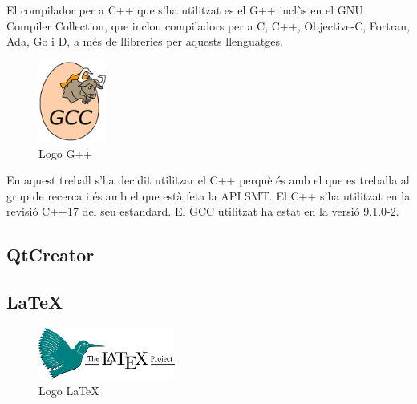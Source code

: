\documentclass[11pt,a4paper,twoside]{report}
\begin{document}
  El compilador per a C++ que s'ha utilitzat es el G++ inclòs en el GNU Compiler Collection, que inclou compiladors per a C, C++, Objective-C, Fortran, Ada, Go i D, a més de llibreries per aquests llenguatges. 
  

  \begin{figure}[ht!]
    \centering
    \includegraphics[width=0.2\textwidth]{Diagrames/gcc.png}
    \caption{Logo G++}
    \label{fig:gpp}
  \end{figure}


  En aquest treball s'ha decidit utilitzar el C++ perquè és amb el que es treballa al grup de recerca i és amb el que està feta la API SMT. El C++ s'ha utilitzat en la revisió C++17 del seu estandard. El GCC utilitzat ha estat en la versió 9.1.0-2. 

  \subsection{QtCreator}




  \subsection{\LaTeX}
  \begin{figure}[ht!]
    \centering
    \includegraphics[width=0.4\textwidth]{Diagrames/latex.png}
    \caption{Logo \LaTeX}
    \label{fig:latex}
  \end{figure}
  
\end{document}
